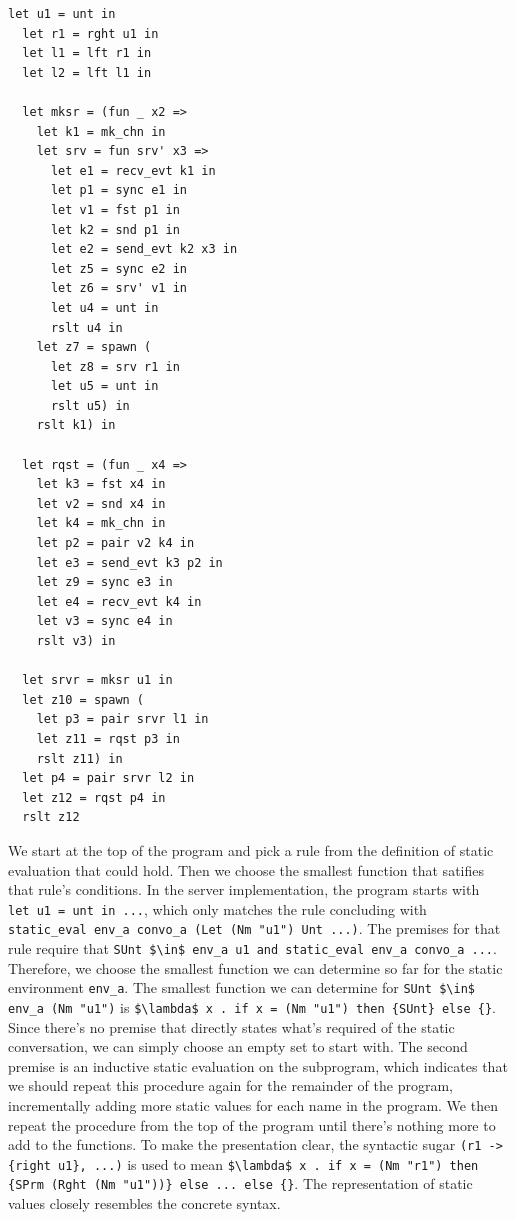 \documentclass{article}
\begin{document}
\begin{lstlisting}[language=normal_lang, mathescape]
  let u1 = unt in
  let r1 = rght u1 in
  let l1 = lft r1 in
  let l2 = lft l1 in

  let mksr = (fun _ x2 => 
    let k1 = mk_chn in
    let srv = fun srv' x3 =>
      let e1 = recv_evt k1 in
      let p1 = sync e1 in
      let v1 = fst p1 in
      let k2 = snd p1 in 
      let e2 = send_evt k2 x3 in
      let z5 = sync e2 in
      let z6 = srv' v1 in
      let u4 = unt in
      rslt u4 in
    let z7 = spawn (
      let z8 = srv r1 in
      let u5 = unt in
      rslt u5) in
    rslt k1) in

  let rqst = (fun _ x4 =>
    let k3 = fst x4 in
    let v2 = snd x4 in
    let k4 = mk_chn in
    let p2 = pair v2 k4 in
    let e3 = send_evt k3 p2 in
    let z9 = sync e3 in
    let e4 = recv_evt k4 in
    let v3 = sync e4 in
    rslt v3) in

  let srvr = mksr u1 in
  let z10 = spawn ( 
    let p3 = pair srvr l1 in
    let z11 = rqst p3 in
    rslt z11) in
  let p4 = pair srvr l2 in
  let z12 = rqst p4 in
  rslt z12
  \end{lstlisting}


We start at the top of the program and pick a rule from the definition of static evaluation that
could hold. Then we choose the smallest function that satifies that rule's conditions. 
In the server implementation, the program starts with \\
\lstinline[language=normal_lang, mathescape]{let u1 = unt in ...}, which only matches
the rule concluding with \\
\lstinline[language=logic, mathescape]{static_eval env_a convo_a (Let (Nm "u1") Unt ...)}. 
The premises for that rule require that 
\lstinline[language=logic, mathescape]{SUnt $\in$ env_a u1 and static_eval env_a convo_a ...}.\\
Therefore, we choose the smallest function we can determine so far for the static environment
\lstinline{env_a}. The smallest function we can determine for 
\lstinline[language=logic, mathescape]{SUnt $\in$ env_a (Nm "u1")} is 
\lstinline[language=logic, mathescape]|$\lambda$ x . if x = (Nm "u1") then {SUnt} else {}|. \\
Since
there's no premise that directly states what's required of the static conversation, we can
simply choose an empty set to start with. The second premise is an inductive static evaluation on
the subprogram, which indicates that we should repeat this procedure again for the remainder of
the program, incrementally adding more static values for each name in the program.  We then repeat
the procedure from the top of the program until there's nothing more to add to the functions.
To make the presentation clear, the syntactic sugar \lstinline|(r1 -> {right u1}, ...)| is used 
to mean
\lstinline[mathescape]|$\lambda$ x . if x = (Nm "r1") then {SPrm (Rght (Nm "u1"))} else ... else {}|.
The representation of static values closely resembles the concrete syntax.
\end{document}
